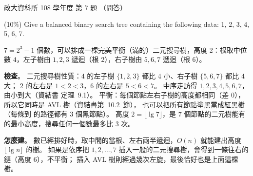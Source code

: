 \begin{pastexam}[label={px:nccu-108-dsa-07}]{政大資科所 108 學年度 第 7 題}
（問答）

(10\%) Give a balanced binary search tree containing the following data: 1, 2, 3, 4, 5, 6, 7.
\end{pastexam}

\begin{pastsoln}
$7 = 2^3 - 1$ 個數，可以排成一棵完美平衡（滿的）二元搜尋樹，高度 $2$：根取中位數 $4$，左子樹由
$1, 2, 3$ 遞迴（根 $2$），右子樹由 $5, 6, 7$ 遞迴（根 $6$）。
\begin{center}
\end{center}

\textbf{檢查}。 二元搜尋樹性質：$4$ 的左子樹 $\{1, 2, 3\}$ 都比 $4$ 小、右子樹 $\{5, 6, 7\}$ 都比 $4$ 大；
$2$ 的左右是 $1 < 2 < 3$，$6$ 的左右是 $5 < 6 < 7$。 中序走訪得 $1, 2, 3, 4, 5, 6, 7$，由小到大（資結書
定理~9.1）。 平衡：每個節點左右子樹的高度都相同（差 $0$），所以它同時是 AVL 樹（資結書第~10.2~節），
也可以把所有節點塗黑當成紅黑樹（每條到 \NIL 的路徑都有 $3$ 個黑節點）。 高度 $2 = \lfloor \lg 7
\rfloor$，是 $7$ 個節點的二元樹能有的最小高度，搜尋任何一個數最多比 $3$ 次。

\textbf{怎麼建}。 數已經排好時，取中間的當根、左右兩半遞迴，$O(n)$ 就能建出高度 $\lfloor \lg n \rfloor$
的樹。 如果是依序把 $1, 2, \ldots, 7$ 插入一般的二元搜尋樹，會得到一條往右的鏈（高度 $6$），不平衡；
插入 AVL 樹則經過幾次左旋，最後恰好也是上面這棵樹。
\end{pastsoln}
